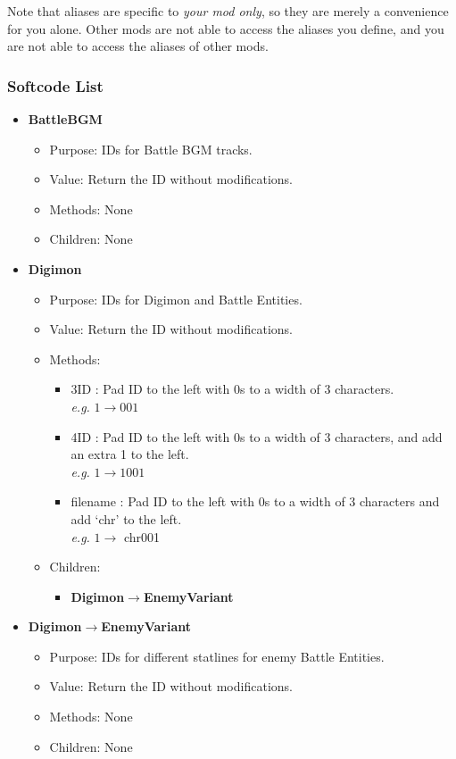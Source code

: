 \documentclass{article}
\begin{document}
Note that aliases are specific to \textit{your mod only}, so they are merely a convenience for you alone. Other mods are not able to access the aliases you define, and you are not able to access the aliases of other mods.

\newpage
\subsubsection{Softcode List}\label{Section:SoftcodeList}
\begin{itemize}
	\item \textbf{BattleBGM}
	\begin{itemize}
		\item Purpose: IDs for Battle BGM tracks.
		\item Value: Return the ID without modifications.
		\item Methods: None
		\item Children: None
	\end{itemize}
	
	\item \textbf{Digimon}
	\begin{itemize}
		\item Purpose: IDs for Digimon and Battle Entities.
		\item Value: Return the ID without modifications.
		\item Methods:
		\begin{itemize}
			\item 3ID : Pad ID to the left with 0s to a width of 3 characters.\\
			\textit{e.g.} $1 \rightarrow 001$
			\item 4ID : Pad ID to the left with 0s to a width of 3 characters, and add an extra 1 to the left.\\
			\textit{e.g.} $1 \rightarrow 1001$
			\item filename : Pad ID to the left with 0s to a width of 3 characters and add `chr' to the left.\\
			\textit{e.g.} $1 \rightarrow$ chr001
		\end{itemize}
		\item Children:
		\begin{itemize}
			\item \textbf{Digimon}$\rightarrow$\textbf{EnemyVariant}
		\end{itemize}
	\end{itemize}
	
	\item \textbf{Digimon}$\rightarrow$\textbf{EnemyVariant}
	\begin{itemize}
		\item Purpose: IDs for different statlines for enemy Battle Entities.
		\item Value: Return the ID without modifications.
		\item Methods: None
		\item Children: None
	\end{itemize}
	

\end{itemize}
\end{document}
